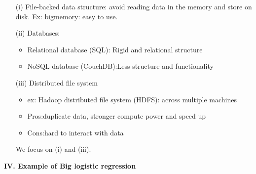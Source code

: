 \documentclass[11pt]{article}
\begin{document}
\begin{itemize}
  \item[(i)] File-backed data structure: avoid reading data in the memory and store on disk. Ex: bigmemory: easy to use.
  \item[(ii)] Databases:
   \begin{itemize}
      \item Relational database (SQL): Rigid and relational structure
      \item NoSQL database (CouchDB):Less structure and functionality
    \end{itemize}

  \item[(iii)] Distributed file system
   \begin{itemize}
      \item ex: Hadoop distributed file system (HDFS): across multiple machines
      \item Pros:duplicate data, stronger compute power and speed up
      \item Cons:hard to interact with data
    \end{itemize}
  We focus on (i) and (iii).
\end{itemize}

\vspace{0.5cm}
\noindent \textbf{\large{IV. Example of Big logistic regression}}\vspace{0.15cm}
\end{document}
